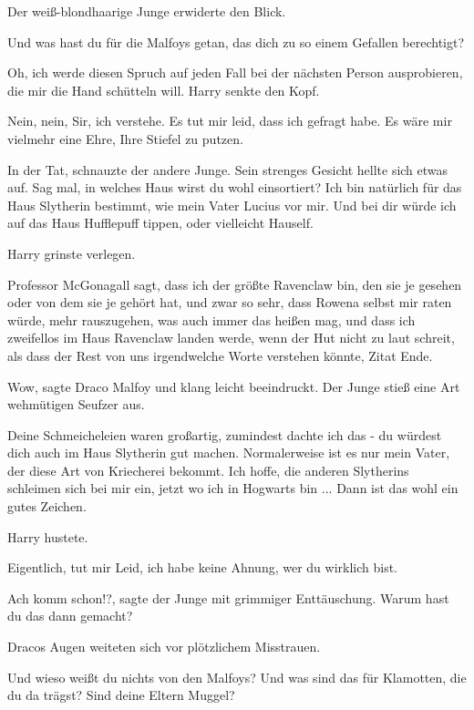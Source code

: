 Der weiß-blondhaarige Junge erwiderte den Blick.

\glqq{}Und was hast du für die Malfoys getan, das dich zu so einem Gefallen
berechtigt?\grqq{}

Oh, ich werde diesen Spruch auf jeden Fall bei der nächsten Person ausprobieren,
die mir die Hand schütteln will. Harry senkte den Kopf.

\glqq{}Nein, nein, Sir, ich verstehe. Es tut mir leid, dass ich gefragt habe. Es
wäre mir vielmehr eine Ehre, Ihre Stiefel zu putzen.\grqq{}

\glqq{}In der Tat\grqq{}, schnauzte der andere Junge. Sein strenges Gesicht
hellte sich etwas auf. \glqq{}Sag mal, in welches Haus wirst du wohl einsortiert?
Ich bin natürlich für das Haus Slytherin bestimmt, wie mein Vater Lucius vor
mir. Und bei dir würde ich auf das Haus Hufflepuff tippen, oder vielleicht
Hauself.

Harry grinste verlegen.

\glqq{}Professor McGonagall sagt, dass ich der größte Ravenclaw bin, den sie je
gesehen oder von dem sie je gehört hat, und zwar so sehr, dass Rowena selbst mir
raten würde, mehr rauszugehen, was auch immer das heißen mag, und dass ich
zweifellos im Haus Ravenclaw landen werde, wenn der Hut nicht zu laut schreit,
als dass der Rest von uns irgendwelche Worte verstehen könnte, Zitat
Ende.\grqq{}

\glqq{}Wow\grqq{}, sagte Draco Malfoy und klang leicht beeindruckt. Der Junge
stieß eine Art wehmütigen Seufzer aus.

\glqq{}Deine Schmeicheleien waren großartig, zumindest dachte ich das - du
würdest dich auch im Haus Slytherin gut machen. Normalerweise ist es nur mein
Vater, der diese Art von Kriecherei bekommt. Ich hoffe, die anderen Slytherins
schleimen sich bei mir ein, jetzt wo ich in Hogwarts bin ... Dann ist das wohl
ein gutes Zeichen.\grqq{}

Harry hustete.

\glqq{}Eigentlich, tut mir Leid, ich habe keine Ahnung, wer du wirklich
bist.\grqq{}

\glqq{}Ach komm schon!?\grqq{}, sagte der Junge mit grimmiger Enttäuschung. \glqq{}
Warum hast du das dann gemacht?\grqq{}

Dracos Augen weiteten sich vor plötzlichem Misstrauen.

\glqq{}Und wieso weißt du nichts von den Malfoys? Und was sind das für Klamotten,
die du da trägst? Sind deine Eltern Muggel?\grqq{}

